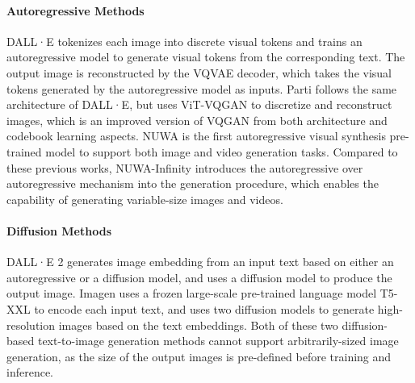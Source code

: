 \documentclass{article}
\begin{document}
\paragraph{Autoregressive Methods}
DALL·E \cite{rameshZeroShotTexttoImageGeneration2021} tokenizes each image into discrete visual tokens and trains an autoregressive model to generate visual tokens from the corresponding text. The output image is reconstructed by the VQVAE decoder, which takes the visual tokens generated by the autoregressive model as inputs.     
Parti \cite{yuScalingAutoregressiveModels2022} follows the same architecture of DALL·E, but uses ViT-VQGAN \cite{yuVectorquantizedImageModeling2022} to discretize and reconstruct images, which is an improved version of VQGAN from both architecture and codebook learning aspects.
NUWA \cite{wuUWAVisualSynthesis2022} is the first autoregressive visual synthesis pre-trained model to support both image and video generation tasks. 
Compared to these previous works, NUWA-Infinity introduces the autoregressive over autoregressive mechanism into the generation procedure, which enables the capability of generating variable-size images and videos. 

\paragraph{Diffusion Methods}
DALL·E 2 \cite{rameshHierarchicalTextConditionalImage2022} generates image embedding from an input text based on either an autoregressive or a diffusion model, and uses a diffusion model to produce the output image.
Imagen \cite{sahariaPhotorealisticTexttoImageDiffusion2022} uses a frozen large-scale pre-trained language model T5-XXL \cite{raffelExploringLimitsTransfer2020} to encode each input text, and uses two diffusion models to generate high-resolution images based on the text embeddings.
Both of these two diffusion-based text-to-image generation methods cannot support arbitrarily-sized image generation, as the size of the output images is pre-defined before training and inference.
\end{document}
